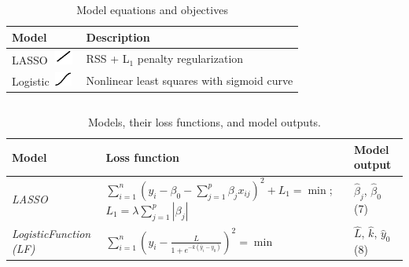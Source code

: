\documentclass[aspectratio=43]{beamer}
\begin{document}
\begin{frame}
\begin{columns}
        \begin{column}{0.5\textwidth}
            \begin{table}[H]
                \centering
                \scriptsize
                \caption{Model equations and objectives}
                \begin{tabular}{|p{2cm}|p{3cm}|}
                \hline
                \textbf{Model} & \textbf{Description} \\
                \hline
                LASSO \includegraphics[width=0.8cm,height=0.5cm,keepaspectratio]{Imgs/lin.png} & RSS + L\ensuremath{_{1}} penalty regularization \\
                \hline
                Logistic \includegraphics[width=0.7cm,height=0.45cm,keepaspectratio]{Imgs/log.png} & Nonlinear least squares with sigmoid curve \\
                \hline
                \end{tabular}
            \end{table}
        \end{column}
    \end{columns}
\begin{table}[H]
    \centering
    \tiny
    \caption{Models, their loss functions, and model outputs.}
    \scriptsize
    \begin{tabularx}{\textwidth}{p{2cm}p{5cm}p{2.5cm}}
    \toprule
    \textbf{Model} & \textbf{Loss function} & \textbf{Model output} \\
    \midrule
    \textit{LASSO} & $\sum_{i=1}^{n} \left( y_i - \beta_0 - \sum_{j=1}^{p} \beta_j x_{ij} \right)^2 + L_1 = \min$; $L_1 = \lambda \sum_{j=1}^{p} |\beta_j|$ & $\hat{\beta}_j$, $\hat{\beta}_0$ (7) \\
    \textit{LogisticFunction (LF)} & $\sum_{i=1}^{n} \left( y_i - \frac{L}{1 + e^{-k(\hat{y}_i - y_0)}} \right)^2 = \min$ & $\hat{L}$, $\hat{k}$, $\hat{y}_0$ (8) \\
    \bottomrule
    \end{tabularx}
    \label{tab:models}
\end{table}
\end{frame}

\end{document}
